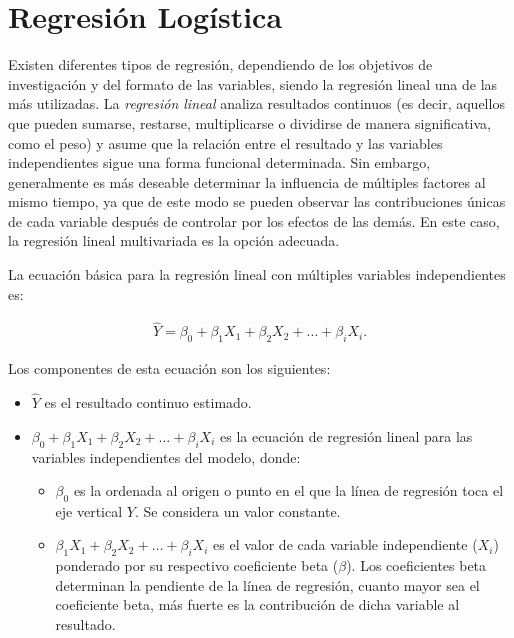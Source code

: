 \documentclass[12pt]{article}
\begin{document}
\section{Regresi\'on Log\'istica}

Existen diferentes tipos de regresi\'on, dependiendo de los objetivos de investigaci\'on y del formato de las variables, siendo la regresi\'on lineal una de las m\'as utilizadas. La \textit{regresi\'on lineal} analiza resultados continuos (es decir, aquellos que pueden sumarse, restarse, multiplicarse o dividirse de manera significativa, como el peso) y asume que la relaci\'on entre el resultado y las variables independientes sigue una forma funcional determinada. Sin embargo, generalmente es m\'as deseable determinar la influencia de m\'ultiples factores al mismo tiempo, ya que de este modo se pueden observar las contribuciones \'unicas de cada variable despu\'es de controlar por los efectos de las dem\'as. En este caso, la regresi\'on lineal multivariada es la opci\'on adecuada.

La ecuaci\'on b\'asica para la regresi\'on lineal con m\'ultiples variables independientes es:

\begin{eqnarray}
\hat{Y} = \beta_0 + \beta_1 X_1 + \beta_2 X_2 + \ldots + \beta_i X_i.
\end{eqnarray}

Los componentes de esta ecuaci\'on son los siguientes:
\begin{itemize}
  \item $\hat{Y}$ es el resultado continuo estimado.
  \item $\beta_0 + \beta_1 X_1 + \beta_2 X_2 + \ldots + \beta_i X_i$ es la ecuaci\'on de regresi\'on lineal para las variables independientes del modelo, donde:
  \begin{itemize}
    \item $\beta_0$ es la ordenada al origen o punto en el que la l\'inea de regresi\'on toca el eje vertical $Y$. Se considera un valor constante.
    \item $\beta_1 X_1 + \beta_2 X_2 + \ldots + \beta_i X_i$ es el valor de cada variable independiente ($X_i$) ponderado por su respectivo coeficiente beta ($\beta$). Los coeficientes beta determinan la pendiente de la l\'inea de regresi\'on, cuanto mayor sea el coeficiente beta, m\'as fuerte es la contribuci\'on de dicha variable al resultado.
  \end{itemize}
\end{itemize}
\end{document}
